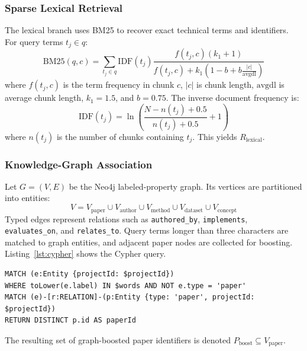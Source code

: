 \documentclass[conference]{IEEEtran}
\begin{document}
\subsubsection{Sparse Lexical Retrieval}
The lexical branch uses BM25 to recover exact technical terms and identifiers. For query terms $t_j \in q$:
\begin{equation}
\mathrm{BM25}(q, c) = \sum_{t_j \in q} \mathrm{IDF}(t_j) \frac{f(t_j, c)(k_1 + 1)}{f(t_j, c) + k_1\left(1 - b + b\frac{|c|}{\mathrm{avgdl}}\right)}
\label{eq:bm25}
\end{equation}
where $f(t_j, c)$ is the term frequency in chunk $c$, $|c|$ is chunk length, $\mathrm{avgdl}$ is average chunk length, $k_1 = 1.5$, and $b = 0.75$. The inverse document frequency is:
\begin{equation}
\mathrm{IDF}(t_j) = \ln\left(\frac{N - n(t_j) + 0.5}{n(t_j) + 0.5} + 1\right)
\label{eq:idf}
\end{equation}
where $n(t_j)$ is the number of chunks containing $t_j$. This yields $R_{\mathrm{lexical}}$.

\subsubsection{Knowledge-Graph Association}
Let $G = (V, E)$ be the Neo4j labeled-property graph. Its vertices are partitioned into entities:
\begin{equation}
V = V_{\mathrm{paper}} \cup V_{\mathrm{author}} \cup V_{\mathrm{method}} \cup V_{\mathrm{dataset}} \cup V_{\mathrm{concept}}
\label{eq:vertices}
\end{equation}
Typed edges represent relations such as \texttt{authored\_by}, \texttt{implements}, \texttt{evaluates\_on}, and \texttt{relates\_to}. Query terms longer than three characters are matched to graph entities, and adjacent paper nodes are collected for boosting. Listing~\ref{lst:cypher} shows the Cypher query.

\begin{lstlisting}[language={},caption={Representative Neo4j Cypher traversal.},label={lst:cypher}]
MATCH (e:Entity {projectId: $projectId})
WHERE toLower(e.label) IN $words AND NOT e.type = 'paper'
MATCH (e)-[r:RELATION]-(p:Entity {type: 'paper', projectId: $projectId})
RETURN DISTINCT p.id AS paperId
\end{lstlisting}

The resulting set of graph-boosted paper identifiers is denoted $P_{\mathrm{boost}} \subseteq V_{\mathrm{paper}}$.
\end{document}
